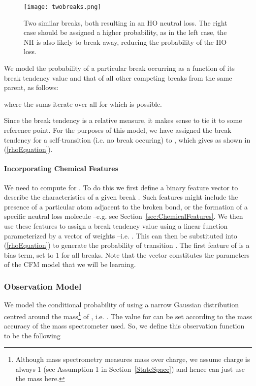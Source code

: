 \begin{figure}[!tpb]
\begin{center}
\texttt{[image: twobreaks.png]}
\caption{\label{fig:twobreaks}Two similar breaks, both resulting in an HO neutral loss. 
The right case should be assigned a higher probability, as in the left case, the NH is also likely to break away, reducing the probability of the HO loss.}
\end{center}
\end{figure}

We model the probability of a particular break  occurring as a function of its break tendency value  and that of all other competing breaks from the same parent, as follows:

where the sums iterate over all  for which  is possible. 

Since the break tendency is a relative measure, it makes sense to tie it to some reference point. 
For the purposes of this model, we have assigned the break tendency for a self-transition (i.e. no break occuring) to , which gives  as shown in (\ref{rhoEquation}). 

\paragraph{Incorporating Chemical Features} 
We need to compute  for . 
To do this we first define a binary feature vector  to describe the characteristics of a given break . 
Such features might include the presence of a particular atom adjacent to the broken bond, or the formation of a specific neutral loss molecule --e.g. see Section~\ref{sec:ChemicalFeatures}.
We then use these features to assign a break tendency value using a linear function parameterized by a vector of weights  --i.e. . This can then be substituted into (\ref{rhoEquation}) to generate the probability of transition .  The first feature of  is a bias term, set to 1 for all breaks.
Note that the vector  constitutes the parameters of the CFM model that we will be learning.

\subsubsection{Observation Model}
\label{ObservationModel}

\newcommand{\mass}{\text{mass}}

We model the conditional probability of  using a narrow Gaussian distribution centred around the mass\footnote{Although mass spectrometry measures mass over charge, we assume charge is always 1 (see Assumption 1 in Section~\ref{StateSpace}) and hence can just use the mass here.} of , i.e. . 
The value for  can be set according to the mass accuracy of the mass spectrometer used. 
So, we define this observation function to be the following


